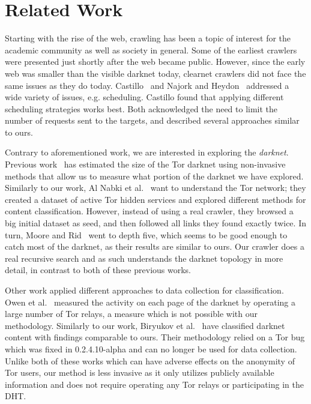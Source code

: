 \section{Related Work}\label{sec:relatedwork}

Starting with the rise of the web, crawling has been a topic of interest  for the academic community as well as society in general. Some of the earliest crawlers \cite{Gray1993,McBryan1994,Eichmann1994,Pinkerton1994} were presented just shortly after the web became public. However, since the early web was smaller than the visible darknet today, clearnet crawlers did not face the same issues as they do today. Castillo~\cite{Castillo2005} and Najork and Heydon~\cite{Najork2002} addressed a wide variety of issues, e.g. scheduling. Castillo found that applying different scheduling strategies works best. Both acknowledged the need to limit the number of requests sent to the targets, and described several approaches similar to ours.

Contrary to aforementioned work, we are interested in exploring the \emph{darknet}.
Previous work~\cite{GeorgeKadianakis2015,TorMetricsOnion} has estimated the size of the Tor darknet using non-invasive methods that allow us to measure what portion of the darknet we have explored.
Similarly to our work, Al Nabki et al.~\cite{Nabki2017} want to understand the Tor network; they created a dataset of active Tor hidden services and explored different methods for content classification. However, instead of using a real crawler, they browsed a big initial dataset as seed, and then followed all links they found exactly twice. In turn, Moore and Rid~\cite{Moore2016} went to depth five, which seems to be good enough to catch most of the darknet, as their results are similar to ours. Our crawler does a real recursive search and as such understands the darknet topology in more detail, in contrast to both of these previous works.

Other work applied different approaches to data collection for classification.
Owen et al.~\cite{Owen2016} measured the activity on each page of the darknet by operating a large number of Tor relays, a measure which is not possible with our methodology. Similarly to our work, Biryukov et al.~\cite{Biryukov2014} have classified darknet content with findings comparable to ours. Their methodology relied on a Tor bug which was fixed in 0.2.4.10-alpha and can no longer be used for data collection. Unlike both of these works which can have adverse effects on the anonymity of Tor users, our method is less invasive as it only utilizes publicly available information and does not require operating any Tor relays or participating in the DHT.

